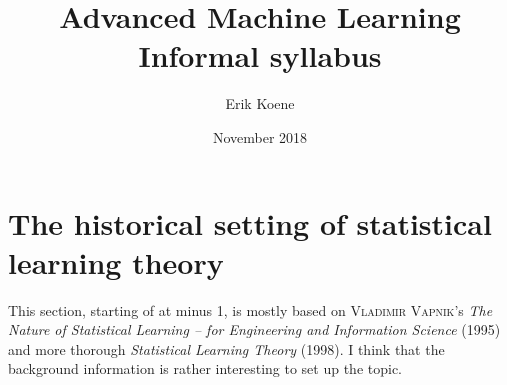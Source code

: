 \documentclass{article}
\title{\textbf{Advanced Machine  Learning}\\Informal syllabus}
\author{Erik Koene}
\date{November 2018}
\begin{document}
\maketitle

\setcounter{section}{-2}
\section{The historical setting of statistical learning theory}
This section, starting of at minus 1, is mostly based on \textsc{Vladimir Vapnik}'s \textit{The Nature of Statistical Learning -- for Engineering and Information Science} (1995) and more thorough \textit{Statistical Learning Theory} (1998). I think that the background information is rather interesting to set up the topic.
\end{document}
